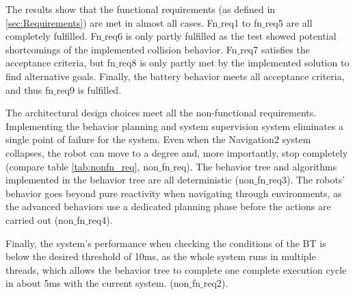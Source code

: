 \begin{table}[ht]
	\centering
	\caption{Results}
	\label{tab:results}
	\renewcommand{\arraystretch}{1.5}
\end{table} 

The results show that the functional requirements (as defined in \ref{sec:Requirements}) are met in almost all cases. Fn$\_$req1 to fn$\_$req5 are all completely fulfilled. Fn$\_$req6 is only partly fulfilled as the test showed potential shortcomings of the implemented collision behavior. Fn$\_$req7 satisfies the acceptance criteria, but fn$\_$req8 is only partly met by the implemented solution to find alternative goals. Finally, the battery behavior meets all acceptance criteria, and thus fn$\_$req9 is fulfilled.

The architectural design choices meet all the non-functional requirements. Implementing the behavior planning and system supervision system eliminates a single point of failure for the system. Even when the Navigation2 system collapses, the robot can move to a degree and, more importantly, stop completely (compare table \ref{tab:nonfn_req}, non$\_$fn$\_$req). The behavior tree and algorithms implemented in the behavior tree are all deterministic (non$\_$fn$\_$req3). The robots' behavior goes beyond pure reactivity when navigating through environments, as the advanced behaviors use a dedicated planning phase before the actions are carried out (non$\_$fn$\_$req4). 

Finally, the system's performance when checking the conditions of the BT is below the desired threshold of 10ms, as the whole system runs in multiple threads, which allows the behavior tree to complete one complete execution cycle in about 5ms with the current system. (non$\_$fn$\_$req2). 